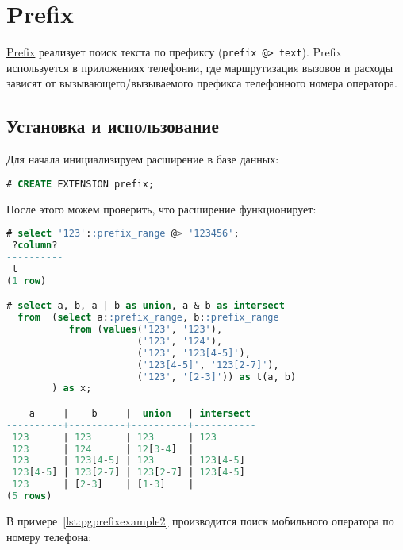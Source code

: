 \section{Prefix}

\href{http://pgfoundry.org/projects/prefix}{Prefix} реализует поиск текста по префиксу (\lstinline!prefix @> text!). Prefix используется в приложениях телефонии, где маршрутизация вызовов и расходы зависят от вызывающего/вызываемого префикса телефонного номера оператора.

\subsection{Установка и использование}

Для начала инициализируем расширение в базе данных:

\begin{lstlisting}[language=SQL,label=lst:pgprefixinit,caption=Инициализация prefix]
# CREATE EXTENSION prefix;
\end{lstlisting}

После этого можем проверить, что расширение функционирует:

\begin{lstlisting}[language=SQL,label=lst:pgprefixexample1,caption=Проверка prefix]
# select '123'::prefix_range @> '123456';
 ?column?
----------
 t
(1 row)

# select a, b, a | b as union, a & b as intersect
  from  (select a::prefix_range, b::prefix_range
           from (values('123', '123'),
                       ('123', '124'),
                       ('123', '123[4-5]'),
                       ('123[4-5]', '123[2-7]'),
                       ('123', '[2-3]')) as t(a, b)
        ) as x;

    a     |    b     |  union   | intersect
----------+----------+----------+-----------
 123      | 123      | 123      | 123
 123      | 124      | 12[3-4]  |
 123      | 123[4-5] | 123      | 123[4-5]
 123[4-5] | 123[2-7] | 123[2-7] | 123[4-5]
 123      | [2-3]    | [1-3]    |
(5 rows)
\end{lstlisting}

В примере~\ref{lst:pgprefixexample2} производится поиск мобильного оператора по номеру телефона:

